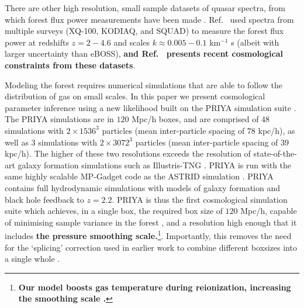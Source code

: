There are other high resolution, small sample datasets of quasar spectra, from which \lya forest flux power measurements have been made \cite{2017MNRAS.466.4332I, 2019MNRAS.489.2536D, 2022MNRAS.509.2842K, 2022MNRAS.515..857E}. Ref.~\cite{2022MNRAS.509.2842K} used spectra from multiple surveys (XQ-100, KODIAQ, and SQUAD) to measure the \lya forest flux power at redshifts $z=2-4.6$ and scales $k\approx0.005-0.1$ km$^{-1}$ s (albeit with larger uncertainty than eBOSS), \textbf{and Ref.~\cite{2022MNRAS.515..857E} presents recent cosmological constraints from these datasets}.

Modeling the \lya forest requires numerical simulations that are able to follow the distribution of gas on small scales.
In this paper we present cosmological parameter inference using a new likelihood built on the PRIYA simulation suite \cite{2023simsuite}.
The PRIYA simulations are in $120$ Mpc/h boxes, and are comprised of $48$ simulations with $2\times 1536^3$ particles (mean inter-particle spacing of $78$ kpc/h), as well as $3$ simulations with $2\times 3072^3$ particles (mean inter-particle spacing of $39$ kpc/h).
The higher of these two resolutions exceeds the resolution of state-of-the-art galaxy formation simulations such as Illustris-TNG \cite{2018MNRAS.475..676S}.
PRIYA is run with the same highly scalable MP-Gadget code as the ASTRID simulation \cite{2022MNRAS.512.3703B,2022MNRAS.513..670N}.
PRIYA contains full hydrodynamic simulations with models of galaxy formation and black hole feedback to $z=2.2$.
PRIYA is thus the first cosmological simulation suite which achieves, in a single box, the required box size of $120$ Mpc/h, capable of minimising sample variance in the \lya forest \cite{2014JCAP...07..005B}, and a resolution high enough that it includes \textbf{the pressure smoothing scale.}\footnote{\textbf{Our model boosts gas temperature during reionization, increasing the smoothing scale \cite{2023simsuite}.}}.
Importantly, this removes the need for the `splicing' correction used in earlier work to combine different boxsizes into a single whole \cite{2014JCAP...07..005B,2020JCAP...04..038P}.

